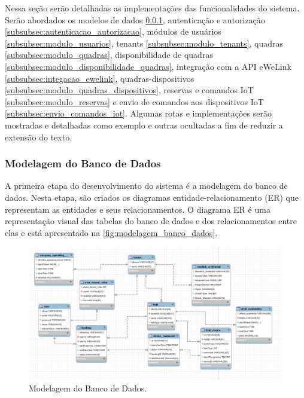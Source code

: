 Nessa seção serão detalhadas as implementações das funcionalidades do sistema. Serão abordados os modelos de dados \ref{subsubsec:modelagem_banco_dados}, autenticação e autorização \ref{subsubsec:autenticacao_autorizacao}, módulos de usuários \ref{subsubsec:modulo_usuarios}, tenants \ref{subsubsec:modulo_tenants}, quadras \ref{subsubsec:modulo_quadras}, disponibilidade de quadras \ref{subsubsec:modulo_disponibilidade_quadras}, integração com a API eWeLink \ref{subsubsec:integacao_ewelink}, quadras-dispositivos \ref{subsubsec:modulo_quadras_dispositivos}, reservas e comandos IoT \ref{subsubsec:modulo_reservas} e envio de comandos aos dispositivos IoT \ref{subsubsec:envio_comandos_iot}. Algumas rotas e implementações serão mostradas e detalhadas como exemplo e outras ocultadas a fim de reduzir a extensão do texto.

\subsubsection{Modelagem do Banco de Dados}\label{subsubsec:modelagem_banco_dados}
A primeira etapa do desenvolvimento do sistema é a modelagem do banco de dados. Nesta etapa, são criados os diagramas entidade-relacionamento (ER) que representam as entidades e seus relacionamentos. O diagrama ER é uma representação visual das tabelas do banco de dados e dos relacionamentos entre elas e está apresentado na \autoref{fig:modelagem_banco_dados}.

\begin{figure}[htp]
	\caption{\label{fig:modelagem_banco_dados}Modelagem do Banco de Dados.}
	\begin{center}
	  \includegraphics[scale=0.38]{images/cap5/modelage_banco_dados.png}
	\end{center}
\end{figure}

